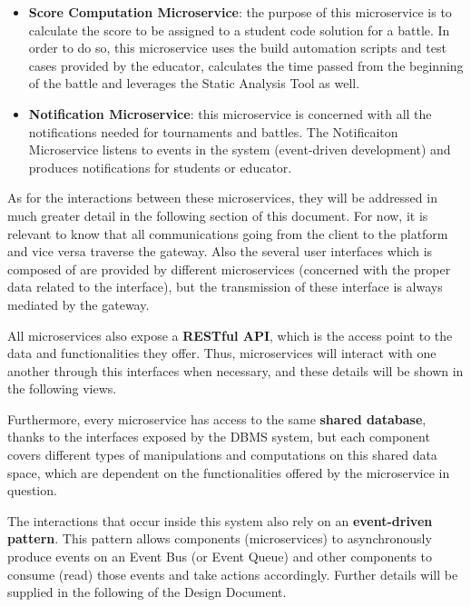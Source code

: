 \begin{itemize}
    \item \textbf{Score Computation Microservice}: the purpose of this microservice is to calculate the score to be assigned to a student code solution for a battle. In order to do so, this microservice uses the build automation scripts and test cases provided by the educator, calculates the time passed from the beginning of the battle and leverages the Static Analysis Tool as well.
    
    \item \textbf{Notification Microservice}: this microservice is concerned with all the notifications needed for tournaments and battles. The Notificaiton Microservice listens to events in the system (event-driven development) and produces notifications for students or educator.
\end{itemize}

As for the interactions between these microservices, they will be addressed in much greater detail in the following section of this document. 
For now, it is relevant to know that all communications going from the client to the \app platform and vice versa traverse the gateway. Also the several user interfaces which \app is composed of are provided by different microservices (concerned with the proper data related to the interface), but the transmission of these interface is always mediated by the gateway.

All microservices also expose a \textbf{RESTful API}, which is the access point to the data and functionalities they offer. Thus, microservices will interact with one another through this interfaces when necessary, and these details will be shown in the following views.

Furthermore, every microservice has access to the same \textbf{shared database}, thanks to the interfaces exposed by the DBMS system, but each component covers different types of manipulations and computations on this shared data space, which are dependent on the functionalities offered by the microservice in question.

The interactions that occur inside this system also rely on an \textbf{event-driven pattern}. This pattern allows components (microservices) to asynchronously produce events on an Event Bus (or Event Queue) and other components to consume (read) those events and take actions accordingly. Further details will be supplied in the following of the Design Document.